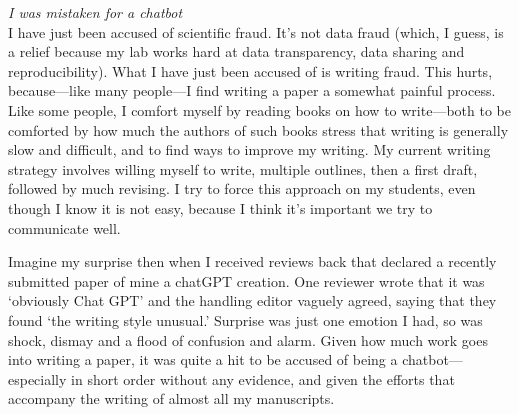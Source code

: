 \documentclass[11pt]{article}
\begin{document}

\renewcommand{\refname}{\CHead{}}


\emph{I was mistaken for a chatbot}\\%

I have just been accused of scientific fraud. It's not data fraud (which, I guess, is a relief because my lab works hard at data transparency, data sharing and reproducibility). What I have just been accused of is writing fraud. This hurts, because---like many people---I find writing a paper a somewhat painful process. %
Like some people, I comfort myself by reading books on how to write---both to be comforted by how much the authors of such books stress that writing is generally slow and difficult, and to find ways to improve my writing. My current writing strategy involves willing myself to write, multiple outlines, then a first draft, followed by much revising. I try to force this approach on my students, even though I know it is not easy, because I think it's important we try to communicate well.


Imagine my surprise then when I received reviews back that declared a recently submitted paper of mine a chatGPT creation. One reviewer wrote that it was `obviously Chat GPT' and the handling editor vaguely agreed, saying that they found `the writing style unusual.' Surprise was just one emotion I had, so was shock, dismay and a flood of confusion and alarm. Given how much work goes into writing a paper, it was quite a hit to be accused of being a chatbot---especially in short order without any evidence, and given the efforts that accompany the writing of almost all my manuscripts. 
\end{document}
